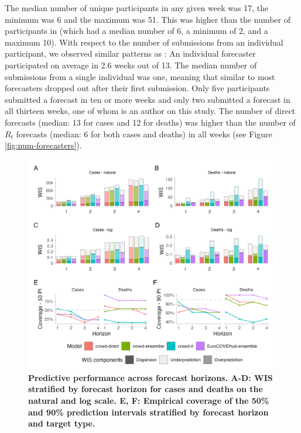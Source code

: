 \documentclass[10pt,a4paper,twocolumn]{article}
\begin{document}
The median number of unique participants in any given week was 17, the minimum was 6 and the maximum was 51. This was higher than the number of participants in \cite{bosseComparingHumanModelbased2022} (which had a median number of 6, a minimum of 2, and a maximum 10). With respect to the number of submissions from an individual participant, we observed similar patterns as \cite{bosseComparingHumanModelbased2022}: An individual forecaster participated on average in 2.6 weeks out of 13. The median number of submissions from a single individual was one, meaning that similar to \citep{bosseComparingHumanModelbased2022} most forecasters dropped out after their first submission. Only five participants submitted a forecast in ten or more weeks and only two submitted a forecast in all thirteen weeks, one of whom is an author on this study. The number of direct forecasts (median: 13 for cases and 12 for deaths) was higher than the number of $R_t$ forecasts (median: 6 for both cases and deaths) in all weeks (see Figure \ref{fig:num-forecasters}). 



\begin{figure}[ht]
\includegraphics[width=0.99\textwidth]{../output/figures/performance.png}
\caption{\bf{Predictive performance across forecast horizons.} A-D: WIS stratified by forecast horizon for cases and deaths on the natural and log scale. E, F: Empirical coverage of the 50\% and 90\% prediction intervals stratified by forecast horizon and target type.}
\label{fig:performance}
\end{figure}
\end{document}
